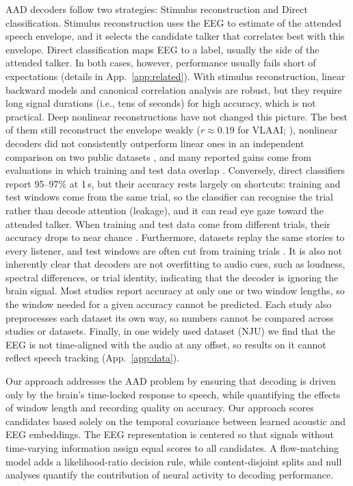 \documentclass[10pt,twocolumn,letterpaper]{article}
\begin{document}
AAD decoders follow two strategies: Stimulus reconstruction and Direct classification. Stimulus
reconstruction uses the EEG to estimate of the attended speech envelope,  and it selects the candidate
talker that correlates best with this envelope. Direct classification maps EEG to a label, usually the
side of the attended talker. In both cases, however, performance usually fails short of expectations (details in App.~\ref{app:related}). With stimulus reconstruction, linear backward models and canonical correlation analysis \citep{osullivan2015attentional, crosse2016mtrf,decheveigne2018decoding} are robust,
but they require long signal durations (i.e., tens of seconds) for high accuracy, which is not practical. Deep nonlinear reconstructions have not changed this picture. The best of them still
reconstruct the envelope weakly ($r\approx0.19$ for VLAAI; \citealp{accou2023vlaai}), nonlinear
decoders did not consistently outperform linear ones in an independent comparison on two
public datasets \citep{geirnaert2021eeg}, and many reported gains come from evaluations in
which training and test data overlap \citep{puffay2023relating}.
Conversely, direct classifiers \citep{vandecappelle2021eeg, darnet2024, dbpnet2024, listennet2025} report 95--97\% at 1\,s, but their accuracy rests largely on shortcuts: training and test windows come from the same trial, so the classifier can recognise the trial rather than decode attention (leakage), and it can read eye gaze toward the attended talker. When training and test data come from different trials, their accuracy drops to near chance \citep{rotaru2024what}.
Furthermore, datasets replay the same stories to every listener, and test
windows are often cut from training trials \citep{puffay2023relating}. %
It is also not inherently clear that decoders are not overfitting to audio cues, such as loudness, spectral
differences, or trial identity, indicating that the decoder is ignoring the brain signal.%
Most studies report accuracy at only one or two window lengths, so the window needed for a given accuracy cannot be predicted. Each study also preprocesses each dataset its own way, so numbers cannot be compared across studies or datasets. Finally, in one widely used dataset (NJU) we find that the EEG is not time-aligned with the audio at any offset, so results on it cannot reflect speech tracking (App.~\ref{app:data}).

Our approach addresses the AAD problem by ensuring that decoding is driven only by the brain's time-locked response to speech, while quantifying the effects of window length and recording quality on accuracy. %
Our approach scores candidates based solely on the temporal covariance between learned acoustic and EEG embeddings. The EEG representation is centered so that signals without time-varying information assign equal scores to all candidates. A flow-matching model adds a likelihood-ratio decision rule, while content-disjoint splits and null analyses quantify the contribution of neural activity to decoding performance.
\end{document}
